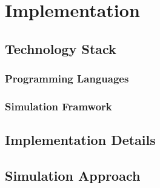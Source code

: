 \chapter{Implementation}\label{chap:implementation}

\section{Technology Stack}\label{sec:technologystack}
\subsection{Programming Languages}\label{subsec:proglangs}
\subsection{Simulation Framwork}\label{subsec:simulationframework}

\section{Implementation Details}\label{sec:implementationdetails}

\section{Simulation Approach}\label{sec:simulationapproach}